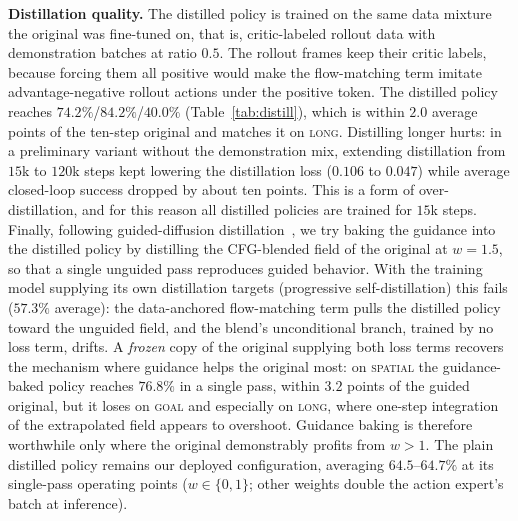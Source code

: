 \documentclass[conference]{IEEEtran}
\begin{document}
\textbf{Distillation quality.} The distilled policy is trained on the same data mixture
the original was fine-tuned on, that is, critic-labeled rollout data with demonstration
batches at ratio $0.5$. The rollout frames keep their critic labels, because forcing them
all positive would make the flow-matching term imitate advantage-negative rollout actions
under the positive token. The distilled policy reaches $74.2\%$/$84.2\%$/$40.0\%$
(Table~\ref{tab:distill}), which is within $2.0$ average points of the ten-step original
and matches it on \textsc{long}. Distilling longer hurts: in a preliminary variant without
the demonstration mix, extending distillation from $15$k to $120$k steps kept lowering the
distillation loss ($0.106$ to $0.047$) while average closed-loop success dropped by about
ten points. This is a form of over-distillation, and for this reason all distilled
policies are trained for $15$k steps. Finally, following guided-diffusion
distillation~\cite{b_cfgdistill}, we try baking the guidance into the distilled policy by
distilling the CFG-blended field of the original at $w{=}1.5$, so that a single unguided
pass reproduces guided behavior. With the training model supplying its own distillation
targets (progressive self-distillation) this fails ($57.3\%$ average): the data-anchored
flow-matching term pulls the distilled policy toward the unguided field, and the blend's
unconditional branch, trained by no loss term, drifts. A \emph{frozen} copy of the
original supplying both loss terms recovers the mechanism where guidance helps the
original most: on \textsc{spatial} the guidance-baked policy reaches $76.8\%$ in a single
pass, within $3.2$ points of the guided original, but it loses on \textsc{goal} and
especially on \textsc{long}, where one-step integration of the extrapolated field appears
to overshoot. Guidance baking is therefore worthwhile only where the original demonstrably
profits from $w{>}1$. The plain distilled policy remains our deployed configuration,
averaging $64.5$--$64.7\%$ at its single-pass operating points ($w\in\{0,1\}$; other
weights double the action expert's batch at inference).
\end{document}
